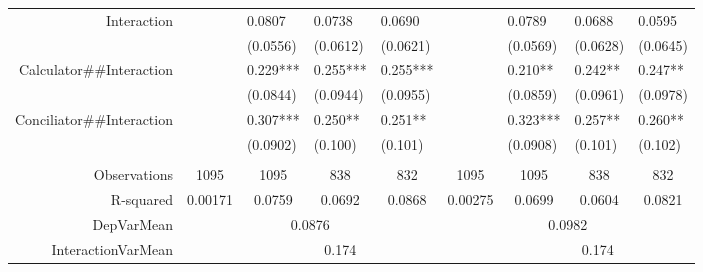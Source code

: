 \begin{tabular}{rrrrrrrrr}
Interaction & \multicolumn{1}{l}{} & \multicolumn{1}{l}{0.0807} & \multicolumn{1}{l}{0.0738} & \multicolumn{1}{l}{0.0690} & \multicolumn{1}{l}{} & \multicolumn{1}{l}{0.0789} & \multicolumn{1}{l}{0.0688} & \multicolumn{1}{l}{0.0595} \\
      & \multicolumn{1}{l}{} & \multicolumn{1}{l}{(0.0556)} & \multicolumn{1}{l}{(0.0612)} & \multicolumn{1}{l}{(0.0621)} & \multicolumn{1}{l}{} & \multicolumn{1}{l}{(0.0569)} & \multicolumn{1}{l}{(0.0628)} & \multicolumn{1}{l}{(0.0645)} \\
Calculator\#\#Interaction & \multicolumn{1}{l}{} & \multicolumn{1}{l}{0.229***} & \multicolumn{1}{l}{0.255***} & \multicolumn{1}{l}{0.255***} & \multicolumn{1}{l}{} & \multicolumn{1}{l}{0.210**} & \multicolumn{1}{l}{0.242**} & \multicolumn{1}{l}{0.247**} \\
      & \multicolumn{1}{l}{} & \multicolumn{1}{l}{(0.0844)} & \multicolumn{1}{l}{(0.0944)} & \multicolumn{1}{l}{(0.0955)} & \multicolumn{1}{l}{} & \multicolumn{1}{l}{(0.0859)} & \multicolumn{1}{l}{(0.0961)} & \multicolumn{1}{l}{(0.0978)} \\
Conciliator\#\#Interaction & \multicolumn{1}{l}{} & \multicolumn{1}{l}{0.307***} & \multicolumn{1}{l}{0.250**} & \multicolumn{1}{l}{0.251**} & \multicolumn{1}{l}{} & \multicolumn{1}{l}{0.323***} & \multicolumn{1}{l}{0.257**} & \multicolumn{1}{l}{0.260**} \\
      & \multicolumn{1}{l}{} & \multicolumn{1}{l}{(0.0902)} & \multicolumn{1}{l}{(0.100)} & \multicolumn{1}{l}{(0.101)} & \multicolumn{1}{l}{} & \multicolumn{1}{l}{(0.0908)} & \multicolumn{1}{l}{(0.101)} & \multicolumn{1}{l}{(0.102)} \\
      & \multicolumn{1}{l}{} & \multicolumn{1}{l}{} & \multicolumn{1}{l}{} & \multicolumn{1}{l}{} & \multicolumn{1}{l}{} & \multicolumn{1}{l}{} & \multicolumn{1}{l}{} & \multicolumn{1}{l}{} \\
      \midrule
Observations & \multicolumn{1}{c}{1095} & \multicolumn{1}{c}{1095} & \multicolumn{1}{c}{838} & \multicolumn{1}{c}{832} & \multicolumn{1}{c}{1095} & \multicolumn{1}{c}{1095} & \multicolumn{1}{c}{838} & \multicolumn{1}{c}{832} \\
R-squared & \multicolumn{1}{c}{0.00171} & \multicolumn{1}{c}{0.0759} & \multicolumn{1}{c}{0.0692} & \multicolumn{1}{c}{0.0868} & \multicolumn{1}{c}{0.00275} & \multicolumn{1}{c}{0.0699} & \multicolumn{1}{c}{0.0604} & \multicolumn{1}{c}{0.0821} \\
DepVarMean & \multicolumn{4}{c}{0.0876}    & \multicolumn{4}{c}{0.0982} \\
InteractionVarMean & \multicolumn{1}{c}{} & \multicolumn{3}{c}{0.174} & \multicolumn{1}{c}{} & \multicolumn{3}{c}{0.174} \\
\bottomrule
\bottomrule
\end{tabular}%
